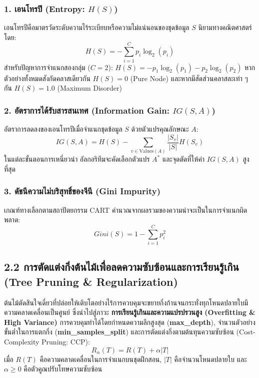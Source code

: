 \documentclass[12pt,a4paper]{article}
\newcommand{\codevar}[1]{\textcolor{codeaccent}{\textbf{#1}}}
\begin{document}
\subsubsection*{1. เอนโทรปี (Entropy: $H(S)$)}
เอนโทรปีคือมาตรวัดระดับความไร้ระเบียบหรือความไม่แน่นอนของชุดข้อมูล $S$ นิยามทางคณิตศาสตร์โดย:
\begin{equation}
    H(S) = -\sum_{i=1}^{C} p_i \log_2(p_i)
\end{equation}
สำหรับปัญหาการจำแนกสองกลุ่ม ($C = 2$): $H(S) = -p_1 \log_2(p_1) - p_2 \log_2(p_2)$ หากตัวอย่างทั้งหมดสังกัดคลาสเดียวกัน $H(S) = 0$ (Pure Node) และหากมีสัดส่วนคลาสละเท่า ๆ กัน $H(S) = 1.0$ (Maximum Disorder)

\subsubsection*{2. อัตราการได้รับสารสนเทศ (Information Gain: $IG(S, A)$)}
อัตราการลดลงของเอนโทรปีเมื่อจำแนกชุดข้อมูล $S$ ด้วยตัวแปรคุณลักษณะ $A$:
\begin{equation}
    IG(S, A) = H(S) - \sum_{v \in \text{Values}(A)} \frac{|S_v|}{|S|} H(S_v)
\end{equation}
ในแต่ละขั้นตอนการเหนี่ยวนำ อัลกอริทึมจะคัดเลือกตัวแปร $A^*$ และจุดตัดที่ให้ค่า $IG(S, A)$ สูงที่สุด

\subsubsection*{3. ดัชนีความไม่บริสุทธิ์ของจีนี (Gini Impurity)}
เกณฑ์ทางเลือกตามสถาปัตยกรรม CART คำนวณจากผลรวมของความน่าจะเป็นในการจำแนกผิดพลาด:
\begin{equation}
    Gini(S) = 1 - \sum_{i=1}^{C} p_i^2
\end{equation}

\subsection*{2.2 การตัดแต่งกิ่งต้นไม้เพื่อลดความซับซ้อนและการเรียนรู้เกิน\\ \normalsize(Tree Pruning \& Regularization)}
ต้นไม้ตัดสินใจเดี่ยวที่ปล่อยให้เติบโตอย่างไร้การควบคุมจะขยายกิ่งก้านจนกระทั่งทุกโหนดปลายใบมีความคลาดเคลื่อนเป็นศูนย์ ซึ่งนำไปสู่ภาวะ \textbf{การเรียนรู้เกินและความแปรปรวนสูง (Overfitting \& High Variance)} การควบคุมทำได้โดยกำหนดความลึกสูงสุด (\codevar{max\_depth}), จำนวนตัวอย่างขั้นต่ำในการแตกกิ่ง (\codevar{min\_samples\_split}) และการตัดแต่งกิ่งตามต้นทุนความซับซ้อน (Cost-Complexity Pruning: CCP):
\begin{equation}
    R_\alpha(T) = R(T) + \alpha |T|
\end{equation}
เมื่อ $R(T)$ คือความคลาดเคลื่อนในการจำแนกบนชุดฝึกสอน, $|T|$ คือจำนวนโหนดปลายใบ และ $\alpha \ge 0$ คือตัวคูณปรับโทษความซับซ้อน
\end{document}
